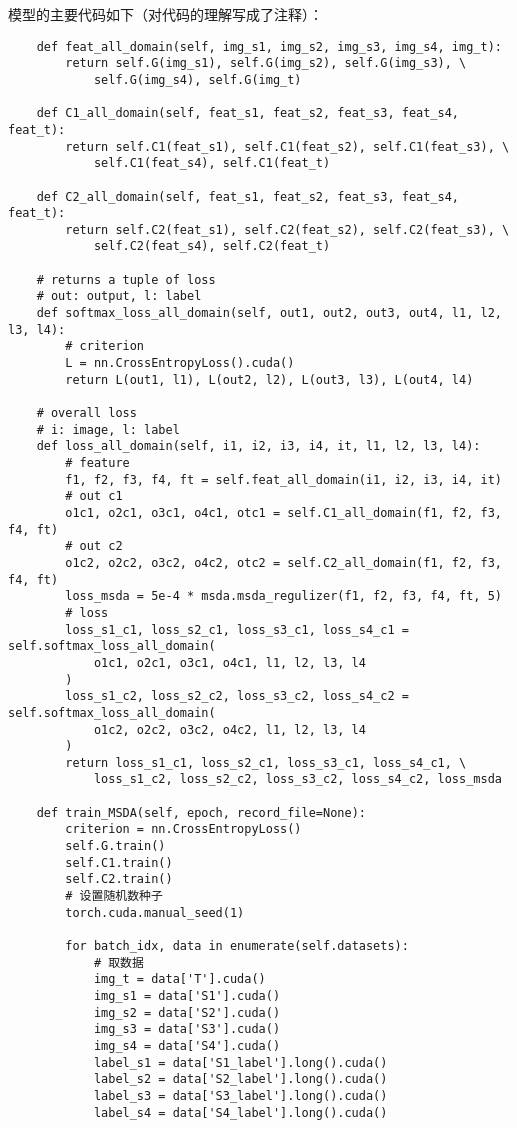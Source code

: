 \documentclass[UTF8]{ctexart}
\begin{document}
                模型的主要代码如下（对代码的理解写成了注释）：
                \begin{verbatim}
    def feat_all_domain(self, img_s1, img_s2, img_s3, img_s4, img_t):
        return self.G(img_s1), self.G(img_s2), self.G(img_s3), \
            self.G(img_s4), self.G(img_t)

    def C1_all_domain(self, feat_s1, feat_s2, feat_s3, feat_s4, feat_t):
        return self.C1(feat_s1), self.C1(feat_s2), self.C1(feat_s3), \
            self.C1(feat_s4), self.C1(feat_t)

    def C2_all_domain(self, feat_s1, feat_s2, feat_s3, feat_s4, feat_t):
        return self.C2(feat_s1), self.C2(feat_s2), self.C2(feat_s3), \
            self.C2(feat_s4), self.C2(feat_t)

    # returns a tuple of loss
    # out: output, l: label
    def softmax_loss_all_domain(self, out1, out2, out3, out4, l1, l2, l3, l4):
        # criterion
        L = nn.CrossEntropyLoss().cuda()
        return L(out1, l1), L(out2, l2), L(out3, l3), L(out4, l4)

    # overall loss
    # i: image, l: label
    def loss_all_domain(self, i1, i2, i3, i4, it, l1, l2, l3, l4):
        # feature
        f1, f2, f3, f4, ft = self.feat_all_domain(i1, i2, i3, i4, it)
        # out c1
        o1c1, o2c1, o3c1, o4c1, otc1 = self.C1_all_domain(f1, f2, f3, f4, ft)
        # out c2
        o1c2, o2c2, o3c2, o4c2, otc2 = self.C2_all_domain(f1, f2, f3, f4, ft)
        loss_msda = 5e-4 * msda.msda_regulizer(f1, f2, f3, f4, ft, 5)
        # loss
        loss_s1_c1, loss_s2_c1, loss_s3_c1, loss_s4_c1 = self.softmax_loss_all_domain(
            o1c1, o2c1, o3c1, o4c1, l1, l2, l3, l4
        )
        loss_s1_c2, loss_s2_c2, loss_s3_c2, loss_s4_c2 = self.softmax_loss_all_domain(
            o1c2, o2c2, o3c2, o4c2, l1, l2, l3, l4
        )
        return loss_s1_c1, loss_s2_c1, loss_s3_c1, loss_s4_c1, \
            loss_s1_c2, loss_s2_c2, loss_s3_c2, loss_s4_c2, loss_msda

    def train_MSDA(self, epoch, record_file=None):
        criterion = nn.CrossEntropyLoss()
        self.G.train()
        self.C1.train()
        self.C2.train()
        # 设置随机数种子
        torch.cuda.manual_seed(1)

        for batch_idx, data in enumerate(self.datasets):
            # 取数据
            img_t = data['T'].cuda()
            img_s1 = data['S1'].cuda()
            img_s2 = data['S2'].cuda()
            img_s3 = data['S3'].cuda()
            img_s4 = data['S4'].cuda()
            label_s1 = data['S1_label'].long().cuda()
            label_s2 = data['S2_label'].long().cuda()
            label_s3 = data['S3_label'].long().cuda()
            label_s4 = data['S4_label'].long().cuda()


\end{verbatim}
\end{document}
